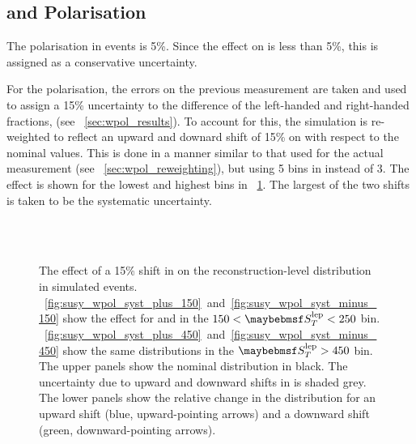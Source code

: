 \subsection[\texorpdfstring{\PW}{W} and \texorpdfstring{\ttbar}{tt} Polarisation]{\boldmath{\PW} and \boldmath{\ttbar} Polarisation}
The polarisation in \ttbar events is 5\%. Since the effect on \RCS is less than
5\%, this is assigned as a conservative uncertainty.

For the \PW polarisation, the errors on the previous measurement are taken and
used to assign a 15\% uncertainty to the difference of the left-handed and
right-handed fractions, \fLmfR (see \sec~\ref{sec:wpol_results}). To account for
this, the simulation is re-weighted to reflect an upward and downard shift of
15\% on \fLmfR with respect to the nominal values. This is done in a manner
similar to that used for the actual measurement (see
\sec~\ref{sec:wpol_reweighting}), but using 5 bins in \PtW instead of 3. The
effect is shown for the lowest and highest \STlep bins in
\fig~\ref{fig:susy_wpol_syst}. The largest of the two shifts is taken to be the
systematic uncertainty.

\begin{figure}
\centering
{}
\\
\\
\caption[Effect of a 15\% shift in \fLmfR on the electron \LP distribution]{The effect of a 15\% shift in \fLmfR on
  the reconstruction-level \LP distribution in simulated \Wenu
  events. \figs~\ref{fig:susy_wpol_syst_plus_150}~and~\ref{fig:susy_wpol_syst_minus_150}
  show the effect for \APelectron and \Pelectron in the $150 < \STlep < 250$
  bin. \figs~\ref{fig:susy_wpol_syst_plus_450}~and~\ref{fig:susy_wpol_syst_minus_450}
  show the same distributions in the $\STlep > 450$ bin. The upper panels show
  the nominal \LP distribution in black. The uncertainty due to upward and downward
  shifts in \fLmfR is shaded grey. The lower panels show the relative change
  in the distribution for an upward shift (blue, upward-pointing arrows) and a
  downward shift (green, downward-pointing arrows).}
\label{fig:susy_wpol_syst}
\end{figure}

